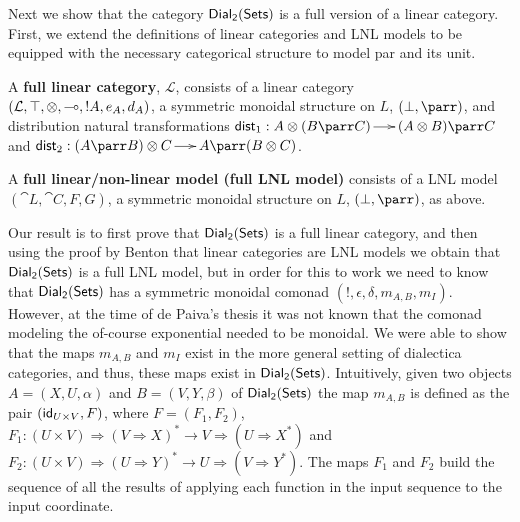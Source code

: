 Next we show that the category $\mathsf{Dial_2}(\mathsf{Sets})$ is a full version of a linear
category. First, we extend the definitions of linear categories and
LNL models to be equipped with the necessary categorical structure to
model par and its unit.
\begin{definition}
  \label{def:full-linear-cat}
  A \textbf{full linear category}, $\mathcal{L}$, consists of a linear
  category \\$(\mathcal{L}, \top, \otimes, \multimap,!A,e_A,d_A)$, a symmetric
  monoidal structure on $L$, $(\perp, \parr)$, and distribution
  natural transformations $\mathsf{dist}_1 : A \otimes (B \parr C) \to
  (A \otimes B) \parr C$ and $\mathsf{dist}_2 : (A \parr B) \otimes C
  \to A \parr (B \otimes C)$.
\end{definition}
\begin{definition}
  \label{def:full-lnl-model}
  A \textbf{full linear/non-linear model (full LNL model)} consists of
  a LNL model $(\cat{L}, \cat{C},F,G)$, a symmetric monoidal structure
  on $L$, $(\perp, \parr)$, as above.
\end{definition}

\noindent
Our result is to first prove that $\mathsf{Dial_2}(\mathsf{Sets})$ is a full linear category,
and then using the proof by Benton that linear categories are LNL
models we obtain that $\mathsf{Dial_2}(\mathsf{Sets})$ is a full LNL model, but in order for
this to work we need to know that $\mathsf{Dial_2}(\mathsf{Sets})$ has a symmetric monoidal
comonad $(!, \epsilon, \delta, m_{A,B}, m_I)$.  However, at the time
of de Paiva's thesis it was not known that the comonad modeling the
of-course exponential needed to be monoidal.  We were able to show
that the maps $m_{A,B}$ and $m_I$ exist in the more general setting of
dialectica categories, and thus, these maps exist in
$\mathsf{Dial_2}(\mathsf{Sets})$. Intuitively, given two objects $A = (X,U,\alpha)$ and $B =
(V,Y,\beta)$ of $\mathsf{Dial_2}(\mathsf{Sets})$ the map $m_{A,B}$ is defined as the pair
$(\mathsf{id}_{U \times V},F)$, where $F = (F_1,F_2)$, $F_1 : (U \times V)
\Rightarrow (V \Rightarrow X)^* \to V \Rightarrow (U \Rightarrow X^*)$
and $F_2 : (U \times V) \Rightarrow (U \Rightarrow Y)^* \to U
\Rightarrow (V \Rightarrow Y^*)$.  The maps $F_1$ and $F_2$ build the
sequence of all the results of applying each function in the input
sequence to the input coordinate.

